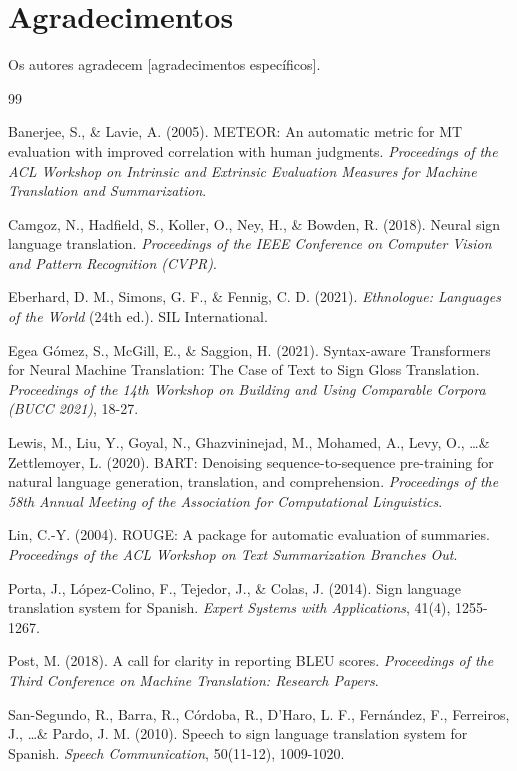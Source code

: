 \documentclass[12pt]{article}
\begin{document}
\section*{Agradecimentos}

Os autores agradecem [agradecimentos específicos].


\begin{thebibliography}{99}

Banerjee, S., \& Lavie, A. (2005). METEOR: An automatic metric for MT evaluation with improved correlation with human judgments. \textit{Proceedings of the ACL Workshop on Intrinsic and Extrinsic Evaluation Measures for Machine Translation and Summarization}.

Camgoz, N., Hadfield, S., Koller, O., Ney, H., \& Bowden, R. (2018). Neural sign language translation. \textit{Proceedings of the IEEE Conference on Computer Vision and Pattern Recognition (CVPR)}.

Eberhard, D. M., Simons, G. F., \& Fennig, C. D. (2021). \textit{Ethnologue: Languages of the World} (24th ed.). SIL International.

Egea Gómez, S., McGill, E., \& Saggion, H. (2021). Syntax-aware Transformers for Neural Machine Translation: The Case of Text to Sign Gloss Translation. \textit{Proceedings of the 14th Workshop on Building and Using Comparable Corpora (BUCC 2021)}, 18-27.

Lewis, M., Liu, Y., Goyal, N., Ghazvininejad, M., Mohamed, A., Levy, O., \ldots \& Zettlemoyer, L. (2020). BART: Denoising sequence-to-sequence pre-training for natural language generation, translation, and comprehension. \textit{Proceedings of the 58th Annual Meeting of the Association for Computational Linguistics}.

Lin, C.-Y. (2004). ROUGE: A package for automatic evaluation of summaries. \textit{Proceedings of the ACL Workshop on Text Summarization Branches Out}.

Porta, J., López-Colino, F., Tejedor, J., \& Colas, J. (2014). Sign language translation system for Spanish. \textit{Expert Systems with Applications}, 41(4), 1255-1267.

Post, M. (2018). A call for clarity in reporting BLEU scores. \textit{Proceedings of the Third Conference on Machine Translation: Research Papers}.

San-Segundo, R., Barra, R., Córdoba, R., D'Haro, L. F., Fernández, F., Ferreiros, J., \ldots \& Pardo, J. M. (2010). Speech to sign language translation system for Spanish. \textit{Speech Communication}, 50(11-12), 1009-1020.


\end{thebibliography}
\end{document}
